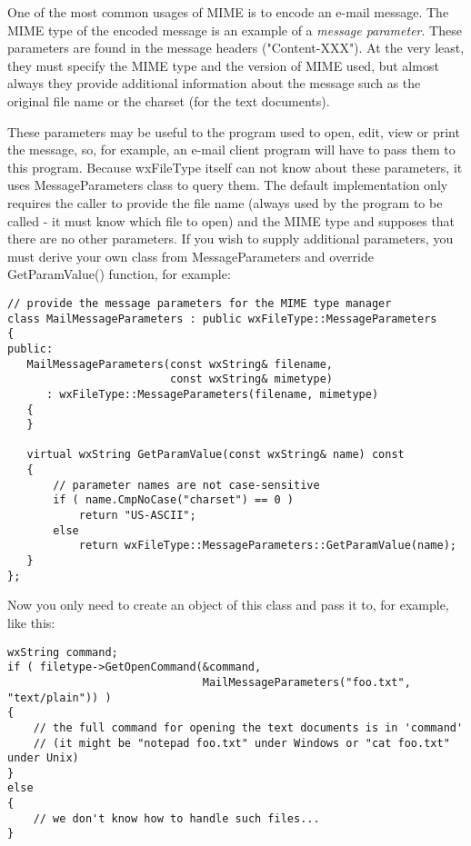 \label{wxfiletypemessageparameters}

One of the most common usages of MIME is to encode an e-mail message. The MIME
type of the encoded message is an example of a {\it message parameter}. These
parameters are found in the message headers ("Content-XXX"). At the very least,
they must specify the MIME type and the version of MIME used, but almost always
they provide additional information about the message such as the original file
name or the charset (for the text documents).

These parameters may be useful to the program used to open, edit, view or print
the message, so, for example, an e-mail client program will have to pass them to
this program. Because wxFileType itself can not know about these parameters,
it uses MessageParameters class to query them. The default implementation only
requires the caller to provide the file name (always used by the program to be
called - it must know which file to open) and the MIME type and supposes that
there are no other parameters. If you wish to supply additional parameters, you
must derive your own class from MessageParameters and override GetParamValue()
function, for example:

\begin{verbatim}
// provide the message parameters for the MIME type manager
class MailMessageParameters : public wxFileType::MessageParameters
{
public:
   MailMessageParameters(const wxString& filename,
                         const wxString& mimetype)
      : wxFileType::MessageParameters(filename, mimetype)
   {
   }

   virtual wxString GetParamValue(const wxString& name) const
   {
       // parameter names are not case-sensitive
       if ( name.CmpNoCase("charset") == 0 )
           return "US-ASCII";
       else
           return wxFileType::MessageParameters::GetParamValue(name);
   }
};
\end{verbatim}

Now you only need to create an object of this class and pass it to, for example,
\rtfsp{} like this:

\begin{verbatim}
wxString command;
if ( filetype->GetOpenCommand(&command,
                              MailMessageParameters("foo.txt", "text/plain")) )
{
    // the full command for opening the text documents is in 'command'
    // (it might be "notepad foo.txt" under Windows or "cat foo.txt" under Unix)
}
else
{
    // we don't know how to handle such files...
}
\end{verbatim}

